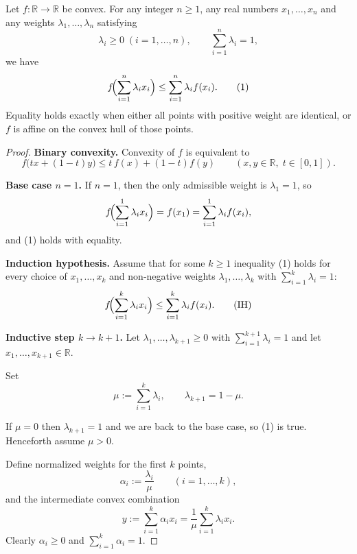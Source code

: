 \begin{theorem}
Let $f:\mathbb R\to\mathbb R$ be convex.  
For any integer $n\ge 1$, any real numbers $x_{1},\dots ,x_{n}$ and any
weights $\lambda_{1},\dots ,\lambda_{n}$ satisfying
\[
\lambda_i\ge 0\;(i=1,\dots ,n),\qquad
\sum_{i=1}^{n}\lambda_i =1,
\]
we have
\begin{equation}
f\!\Bigl(\sum_{i=1}^{n}\lambda_i x_i\Bigr)\le
\sum_{i=1}^{n}\lambda_i f(x_i).\tag{1}
\end{equation}
Equality holds exactly when either all points with positive weight are
identical, or $f$ is affine on the convex hull of those points.
\end{theorem}

\begin{proof}
\textbf{Binary convexity.}  
Convexity of $f$ is equivalent to
\begin{equation}
f\bigl(t x+(1-t)y\bigr)\le t\,f(x)+(1-t)f(y)\qquad
(x,y\in\mathbb R,\;t\in[0,1]).\tag{C}
\end{equation}

\medskip\noindent\textbf{Base case $n=1$.}  
If $n=1$, then the only admissible weight is $\lambda_{1}=1$, so
\[
f\!\Bigl(\sum_{i=1}^{1}\lambda_i x_i\Bigr)=f(x_{1})
=\sum_{i=1}^{1}\lambda_i f(x_i),
\]
and (1) holds with equality.

\medskip\noindent\textbf{Induction hypothesis.}  
Assume that for some $k\ge1$ inequality (1) holds for every choice of
$x_{1},\dots ,x_{k}$ and non‑negative weights $\lambda_{1},\dots ,\lambda_{k}$
with $\sum_{i=1}^{k}\lambda_i=1$:
\begin{equation}
f\!\Bigl(\sum_{i=1}^{k}\lambda_i x_i\Bigr)\le
\sum_{i=1}^{k}\lambda_i f(x_i).\tag{IH}
\end{equation}

\medskip\noindent\textbf{Inductive step $k\to k+1$.}  
Let $\lambda_{1},\dots ,\lambda_{k+1}\ge0$ with $\sum_{i=1}^{k+1}\lambda_i=1$
and let $x_{1},\dots ,x_{k+1}\in\mathbb R$.

Set
\[
\mu:=\sum_{i=1}^{k}\lambda_i,\qquad
\lambda_{k+1}=1-\mu .
\]

If $\mu=0$ then $\lambda_{k+1}=1$ and we are back to the base case,
so (1) is true.  Henceforth assume $\mu>0$.

Define normalized weights for the first $k$ points,
\[
\alpha_i:=\frac{\lambda_i}{\mu}\qquad(i=1,\dots ,k),
\]
and the intermediate convex combination
\[
y:=\sum_{i=1}^{k}\alpha_i x_i
   =\frac{1}{\mu}\sum_{i=1}^{k}\lambda_i x_i .
\]
Clearly $\alpha_i\ge0$ and $\sum_{i=1}^{k}\alpha_i=1$.


\end{proof}
